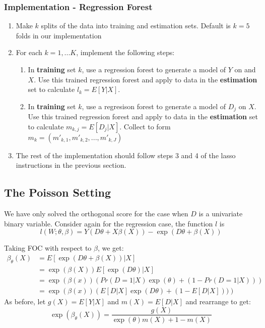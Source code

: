 \documentclass[11pt]{article}
\begin{document}
\subsubsection{Implementation - Regression Forest}
\begin{enumerate}
	\item Make $k$  splits of the data into training and estimation sets. Default is $k = 5$ folds in our implementation

	\item For each $k = 1, ... K$, implement the following steps:
  \begin{enumerate}
    \item In \textbf{training} set $k$, use a regression forest to generate a model of $Y$ on and $X$. Use this trained regression forest and apply to data in the \textbf{estimation} set to calculate $l_k = E[Y|X]$.
    \item In \textbf{training} set $k$, use a regresison forest to generate a model of $D_j$ on $X$. Use this trained regression forest and apply to data in the \textbf{estimation} set to calculate $m_{k, j} = E[D_j|X]$. Collect to form $m_k = (m'_{k,1}, m'_{k,2}, . . ., m'_{k, J})$
  \end{enumerate}
  \item The rest of the implementation should follow steps 3 and 4 of the lasso instructions in the previous section.
\end{enumerate}

\subsection{The Poisson Setting}
We have only solved the orthogonal score for the case when $D$ is a univariate binary variable. Consider again for the regression case, the function $l$ is
\begin{equation*}
	l(W; \theta, \beta) = Y(D\theta + X\beta(X)) - \exp(D\theta + \beta(X))
\end{equation*}

\noindent Taking FOC with respect to $\beta$, we get:
\begin{align*}
	\beta_\theta(X) &= E[\exp(D\theta + \beta(X)) | X] \\
  &= \exp(\beta(X)) E[\exp(D\theta)|X] \\
  &= \exp(\beta(x)) \left(Pr(D = 1 | X)\exp(\theta) + (1 - Pr(D = 1 | X))\right) \\
	&= \exp(\beta(x)) \left(E[D | X]\exp(D\theta) + (1-E[D|X]))\right)
\end{align*}
As before, let $g(X) = E[Y|X]$ and $m(X) = E[D|X]$ and rearrange to get:
$$\exp \left(\beta_{\theta}(X)\right)=\frac{g(X)}{\exp (\theta) m(X)+1-m(X)}$$
\end{document}
